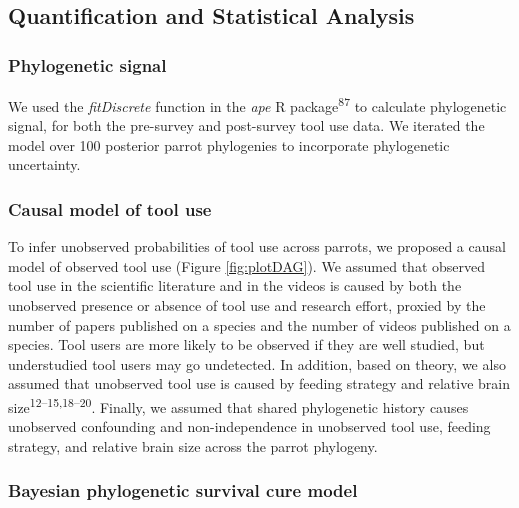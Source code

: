 \documentclass[
  man, donotrepeattitle,floatsintext]{apa6}
\begin{document}
\hypertarget{quantification-and-statistical-analysis}{%
\subsection{Quantification and Statistical Analysis}\label{quantification-and-statistical-analysis}}

\hypertarget{phylogenetic-signal}{%
\subsubsection{Phylogenetic signal}\label{phylogenetic-signal}}

We used the \emph{fitDiscrete} function in the \emph{ape} R package\textsuperscript{87} to
calculate phylogenetic signal, for both the pre-survey and post-survey tool use
data. We iterated the model over 100 posterior parrot phylogenies to incorporate
phylogenetic uncertainty.

\hypertarget{causal-model-of-tool-use}{%
\subsubsection{Causal model of tool use}\label{causal-model-of-tool-use}}

To infer unobserved probabilities of tool use across parrots, we proposed a
causal model of observed tool use (Figure \ref{fig:plotDAG}). We assumed that
observed tool use in the scientific literature and in the videos is caused by
both the unobserved presence or absence of tool use and research effort, proxied
by the number of papers published on a species and the number of videos
published on a species. Tool users are more likely to be observed if they are
well studied, but understudied tool users may go undetected. In addition, based
on theory, we also assumed that unobserved tool use is caused by feeding
strategy and relative brain size\textsuperscript{12--15,18--20}. Finally, we
assumed that shared phylogenetic history causes unobserved confounding and
non-independence in unobserved tool use, feeding strategy, and relative brain
size across the parrot phylogeny.

\hypertarget{bayesian-phylogenetic-survival-cure-model}{%
\subsubsection{Bayesian phylogenetic survival cure model}\label{bayesian-phylogenetic-survival-cure-model}}
\end{document}
